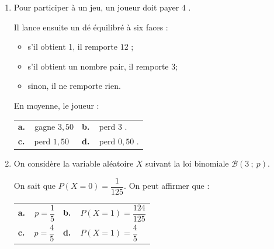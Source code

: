 \documentclass[10pt]{article}
\providecommand{\euro}{\texteuro}
\providecommand{\euro}{{\text{€}}}
\renewcommand{\euro}{\ifmmode\text{\texteuro}\else\texteuro\fi}
\begin{document}
\begin{enumerate}
\item Pour participer à un jeu, un joueur doit payer $4$ \euro.

Il lance ensuite un dé équilibré à six faces :

\begin{itemize}
\item s'il obtient 1, il remporte $12$ \euro{};
\item s'il obtient un nombre pair, il remporte $3$\euro{};
\item sinon, il ne remporte rien.
\end{itemize}

En moyenne, le joueur :

\begin{center}
\begin{tabularx}{\linewidth}{*{2}{X}}
\textbf{a.~~}gagne $3,50$ \euro&\textbf{b.~~}perd $3$ \euro.\\
\textbf{c.~~}perd $1,50$ \euro&\textbf{d.~~}perd $0,50$ \euro.
\end{tabularx}
\end{center}

\item On considère la variable aléatoire $X$ suivant la loi binomiale $\mathcal{B}(3~;~p)$.

On sait que $P(X = 0) = \dfrac{1}{125}$. On peut affirmer que :

\begin{center}
\renewcommand\arraystretch{1.9}
\begin{tabularx}{\linewidth}{*{2}{X}}
\textbf{a.~~}$p = \dfrac{1}{5}$&\textbf{b.~~}$P(X = 1) =\dfrac{124}{125}$\\
\textbf{c.~~}$p = \dfrac{4}{5}$&\textbf{d.~~}$P(X= 1) =\dfrac{4}{5}$
\end{tabularx}
\end{center}
\end{enumerate}
\end{document}

